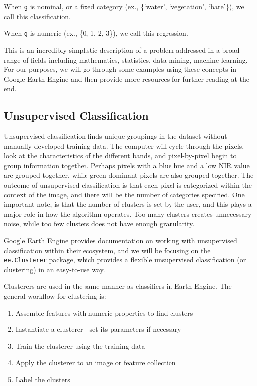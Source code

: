 \documentclass[
]{article}
\providecommand{\tightlist}{%
  \setlength{\itemsep}{0pt}\setlength{\parskip}{0pt}}
\begin{document}
When \texttt{g} is nominal, or a fixed category (ex., \{`water', `vegetation', `bare'\}), we call this classification.

When \texttt{g} is numeric (ex., \{0, 1, 2, 3\}), we call this regression.

This is an incredibly simplistic description of a problem addressed in a broad range of fields including mathematics, statistics, data mining, machine learning. For our purposes, we will go through some examples using these concepts in Google Earth Engine and then provide more resources for further reading at the end.

\hypertarget{unsupervised-classification}{%
\subsection{Unsupervised Classification}\label{unsupervised-classification}}

Unsupervised classification finds unique groupings in the dataset without manually developed training data. The computer will cycle through the pixels, look at the characteristics of the different bands, and pixel-by-pixel begin to group information together. Perhaps pixels with a blue hue and a low NIR value are grouped together, while green-dominant pixels are also grouped together. The outcome of unsupervised classification is that each pixel is categorized within the context of the image, and there will be the number of categories specified. One important note, is that the number of clusters is set by the user, and this plays a major role in how the algorithm operates. Too many clusters creates unnecessary noise, while too few clusters does not have enough granularity.

Google Earth Engine provides \href{https://developers.google.com/earth-engine/guides/clustering}{documentation} on working with unsupervised classification within their ecosystem, and we will be focusing on the \texttt{ee.Clusterer} package, which provides a flexible unsupervised classification (or clustering) in an easy-to-use way.

Clusterers are used in the same manner as classifiers in Earth Engine. The general workflow for clustering is:

\begin{enumerate}
\def\labelenumi{\arabic{enumi}.}
\tightlist
\item
  Assemble features with numeric properties to find clusters
\item
  Instantiate a clusterer - set its parameters if necessary
\item
  Train the clusterer using the training data
\item
  Apply the clusterer to an image or feature collection
\item
  Label the clusters
\end{enumerate}
\end{document}
